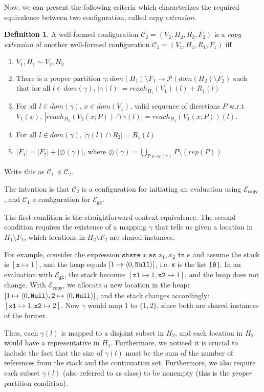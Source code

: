 \documentclass{easychair}
\newcommand{\ms}[1]{\ensuremath{\mathsf{#1}}}
\newcommand{\irl}[1]{\mathtt{#1}}
\newcommand{\sharecst}[4]{\irl{share}\;#1\;\irl{as}\;#2,#3\;\irl{in}\;#4}
\newcommand{\oh}[1]{\oslash(#1)}
\newcommand{\gcSem}{\ensuremath{\mathcal{E}_{\ms{gc}}}}
\newcommand{\copySem}{\ensuremath{\mathcal{E}_{\ms{copy}}}}
\theoremstyle{definition}
\newtheorem{definition}{Definition}
\begin{document}
Now, we can present the following 
criteria which characterizes the required equivalence between two configuration,
called \emph{copy extension}.
\begin{definition}
A well-formed configuration $\mathcal{C}_2 = (V_2,H_2,R_2,F_2)$ is a \emph{copy extension} of another well-formed configuration
$\mathcal{C}_1 = (V_1,H_1,R_1,F_1)$ iff
\begin{enumerate}
\item $V_1,H_1 \sim V_2,H_2$
\item There is a proper partition $\gamma : dom(H_1) \setminus F_1 \to \mathcal{P}(dom(H_2) \setminus F_2)$ 
such that for all $l \in dom(\gamma)$, $|\gamma(l)| = reach_{H_1}(V_1)(l) + R_1(l)$
\item For all $l \in dom(\gamma)$, $x \in dom(V_1)$, valid sequence of directions $P$ w.r.t $V_1(x)$,
	$|reach_{H_2}(V_2(x;P)) \cap \gamma(l)| = reach_{H_1}(V_1(x;P))(l)$.
\item	For all $l \in dom(\gamma)$, $|\gamma(l) \cap R_2| = R_1(l)$
\item $|F_1| = |F_2| + |\oh{\gamma}|$, where 
	$\oh{\gamma} = \bigcup_{P \in ec(\gamma)} P \setminus (rep(P))$
\end{enumerate}
Write this as $\mathcal{C}_1 \preceq \mathcal{C}_2$.
\end{definition} 

The intention is that $\mathcal{C}_2$ is a configuration for initiating an evaluation using \copySem
, and $\mathcal{C}_1$ a configuration for \gcSem. 


The first condition is the straightforward context equivalence.
The second condition requires the existence of 
a mapping $\gamma$ that tells us given a location in $H_1 \setminus F_1$, which locations in 
$H_2 \setminus F_2$ are shared instances.

For example, consider the expression $\sharecst{x}{x_1}{x_2}{e}$ and
assume the stack is $[\texttt{x} \mapsto 1]$, and the heap equals 
$[1 \mapsto \pairexcst{0}{\irl{Null}}]$, i.e. \texttt{x} is the list \texttt{[0]}.
In an evaluation with \gcSem{}, the stack becomes 
$[\texttt{x1} \mapsto 1,\texttt{x2} \mapsto 1]$, and the heap does not change. With 
\copySem, we allocate a new location in the heap:
$[1 \mapsto \pairexcst{0}{\irl{Null}},2 \mapsto \pairexcst{0}{\irl{Null}}]$, and the 
stack changes accordingly: $[\texttt{x1} \mapsto 1,\texttt{x2} \mapsto 2]$.
Now $\gamma$ would map 1 to $\{1,2\}$, since both are shared instances of the former.

Thus, each $\gamma(l)$ is mapped to a disjoint subset in $H_2$, and each location in $H_2$ 
would have a representative in $H_1$. Furthermore, we noticed it is crucial to include the 
fact that the size of $\gamma(l)$ must be the sum of the number of references from the stack and 
the continuation set. Furthermore, we also require each subset $\gamma(l)$ (also referred to as class)
to be nonempty (this is the \emph{proper} partition condition).
\end{document}
